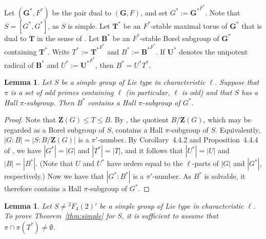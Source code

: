 \documentclass[12pt]{amsart}
\newtheorem{lemma}[theorem]{Lemma}
\theoremstyle{definition}
\numberwithin{equation}{section}
\newcommand{\bG}{{\mathbf{G}}}
\newcommand{\bT}{{\mathbf{T}}}
\newcommand{\bB}{{\mathbf{B}}}
\newcommand{\bU}{{\mathbf{U}}}
\newcommand{\bZ}{{\mathbf{Z}}}
\begin{document}
Let $(\bG^*,F^*)$ be the pair dual to $(\bG,F)$, and %
set
$G^*:={\bG^*}^{F^*}$. Note %
that $S=[G^*,G^*]$, as $S$ is simple. Let
$\bT^*$ be an $F^*$-stable maximal torus of $\bG^*$ that is dual to
$\bT$ in the sense of \cite[Proposition~4.3.1]{Carter85}. Let
$\bB^*$ be an %
$F^*$-stable Borel %
subgroup of $\bG^*$ %
containing
$\bT^*$. Write %
$T^*:={\bT^*}^{F^*}$ %
and $B^*:={\bB^*}^{F^*}$. If %
$\bU^*$ denotes the unipotent radical %
of $\bB^*$ and %
$U^*:={\bU^*}^{F^*}$, then $B^*=U^*T^*$.


\begin{lemma}\label{lem:Gross}
Let $S$ be a simple group of Lie type in characteristic $\ell$.
Suppose that $\pi$ is a set of odd primes containing $\ell$ (in
particular, $\ell$ is odd) and that $S$ has a Hall $\pi$-subgroup.
Then $B^*$ contains a Hall $\pi$-subgroup of $G^*$.
\end{lemma}

\begin{proof}
Note that $\bZ(G)\le T\le B$. By \cite[Theorem~3.2]{G86}, the
quotient $B/\bZ(G)$, which may be regarded as a Borel subgroup of
$S$, contains a Hall $\pi$-subgroup of $S$. Equivalently, $|G:B| =
|S : B/\bZ(G)|$ is a $\pi'$-number. By Corollary~4.4.2 and
Proposition~4.4.4 of \cite{Carter85}, we have $|G^*|=|G|$ and
$|T^*|=|T|$, and it follows that $|U^*|=|U|$ and $|B|=|B^*|$. (Note
that $U$ and $U^*$ have orders equal to the $\ell$-parts of $|G|$
and $|G^*|$, respectively.) Now we have that $|G^*:B^*|$ is a
$\pi'$-number. As $B^*$ is solvable, it therefore contains a Hall
$\pi$-subgroup of $G^*$.
\end{proof}

\begin{lemma}\label{lem:Gross2}
Let $S\neq {}^2F_4(2)'$ be a simple group of Lie type in
characteristic $\ell$. To prove Theorem~\ref{thm:simple} for $S$, it
is sufficient to assume that $\pi\cap\pi(T^*)\neq\emptyset$.
\end{lemma}
\end{document}
